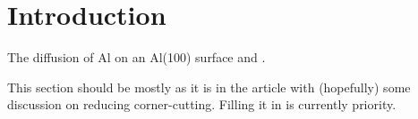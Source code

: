 \section{Introduction}
\label{sec:erm-introduction}

The diffusion of Al on an Al(100) surface and .

This section should be mostly as it is in the article with (hopefully) some discussion on reducing corner-cutting.
Filling it in is currently  priority.

\placeholder

